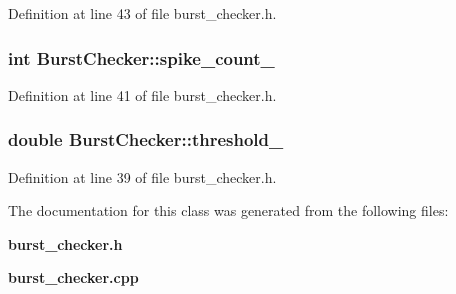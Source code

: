 \-Definition at line 43 of file burst\-\_\-checker.\-h.

\subsubsection[{spike\-\_\-count\-\_\-}]{\setlength{\rightskip}{0pt plus 5cm}int {\bf \-Burst\-Checker\-::spike\-\_\-count\-\_\-}\hspace{0.3cm}{\ttfamily  [private]}}\label{classBurstChecker_ae2df448015f969dd344ddf191041f0b6}


\-Definition at line 41 of file burst\-\_\-checker.\-h.

\subsubsection[{threshold\-\_\-}]{\setlength{\rightskip}{0pt plus 5cm}double {\bf \-Burst\-Checker\-::threshold\-\_\-}\hspace{0.3cm}{\ttfamily  [private]}}\label{classBurstChecker_a3beac5bf72ad37dc372ef9258153e826}


\-Definition at line 39 of file burst\-\_\-checker.\-h.



\-The documentation for this class was generated from the following files\-:\begin{DoxyCompactItemize}
\item 
{\bf burst\-\_\-checker.\-h}\item 
{\bf burst\-\_\-checker.\-cpp}\end{DoxyCompactItemize}
